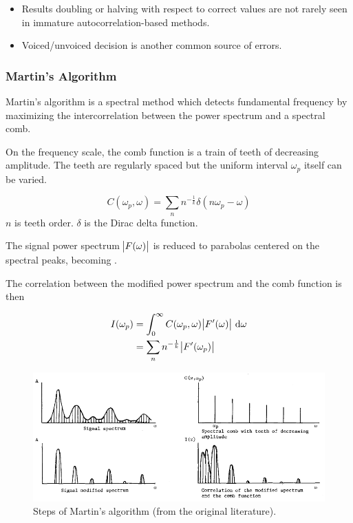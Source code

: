 \documentclass[11pt,a4paper,titlepage]{article}
\begin{document}
\begin{itemize}
  \item Results doubling or halving with respect to correct values are not rarely seen in immature autocorrelation-based methods.
  \item Voiced/unvoiced decision is another common source of errors.
\end{itemize}

\subsubsection{Martin's Algorithm}

Martin's algorithm is a spectral method which detects fundamental frequency by maximizing the intercorrelation between the power spectrum and a spectral comb.

On the frequency scale, the comb function is a train of teeth of decreasing amplitude.
The teeth are regularly spaced but the uniform interval \(\omega_p\) itself can be varied.

\begin{equation}
  C(\omega_p, \omega) = \sum_n n^{-\frac{1}{k}} \delta (n \omega_p - \omega)
\end{equation}
\(n\) is teeth order.
\(\delta\) is the Dirac delta function.

The signal power spectrum \(\abs{F(\omega)}\) is reduced to parabolas centered on the spectral peaks, becoming .

The correlation between the modified power spectrum and the comb function is then

\begin{equation}
  \begin{split}
    I (\omega_p) & = \int_{0}^{\infty} C(\omega_p, \omega) \abs{F'(\omega)} \, \mathrm{d} \omega \\
      & = \sum_n n^{-\frac{1}{k}} \abs{F'(\omega_p)}
  \end{split}
\end{equation}

\begin{figure}[htbp]
  \centering
  \includegraphics[width=\textwidth]{martin-algo.png}
  \caption{Steps of Martin's algorithm (from the original literature).} \label{fig:martin-algo}
\end{figure}
\end{document}

